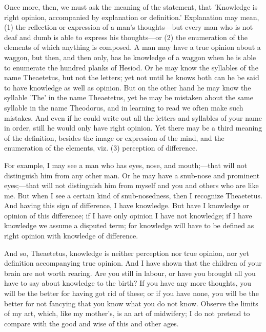 \documentclass[11pt,letter]{article}
\begin{document}
\par  Once more, then, we must ask the meaning of the statement, that 'Knowledge is right opinion, accompanied by explanation or definition.' Explanation may mean, (1) the reflection or expression of a man's thoughts—but every man who is not deaf and dumb is able to express his thoughts—or (2) the enumeration of the elements of which anything is composed. A man may have a true opinion about a waggon, but then, and then only, has he knowledge of a waggon when he is able to enumerate the hundred planks of Hesiod. Or he may know the syllables of the name Theaetetus, but not the letters; yet not until he knows both can he be said to have knowledge as well as opinion. But on the other hand he may know the syllable 'The' in the name Theaetetus, yet he may be mistaken about the same syllable in the name Theodorus, and in learning to read we often make such mistakes. And even if he could write out all the letters and syllables of your name in order, still he would only have right opinion. Yet there may be a third meaning of the definition, besides the image or expression of the mind, and the enumeration of the elements, viz. (3) perception of difference.

\par  For example, I may see a man who has eyes, nose, and mouth;—that will not distinguish him from any other man. Or he may have a snub-nose and prominent eyes;—that will not distinguish him from myself and you and others who are like me. But when I see a certain kind of snub-nosedness, then I recognize Theaetetus. And having this sign of difference, I have knowledge. But have I knowledge or opinion of this difference; if I have only opinion I have not knowledge; if I have knowledge we assume a disputed term; for knowledge will have to be defined as right opinion with knowledge of difference.

\par  And so, Theaetetus, knowledge is neither perception nor true opinion, nor yet definition accompanying true opinion. And I have shown that the children of your brain are not worth rearing. Are you still in labour, or have you brought all you have to say about knowledge to the birth? If you have any more thoughts, you will be the better for having got rid of these; or if you have none, you will be the better for not fancying that you know what you do not know. Observe the limits of my art, which, like my mother's, is an art of midwifery; I do not pretend to compare with the good and wise of this and other ages.
\end{document}
